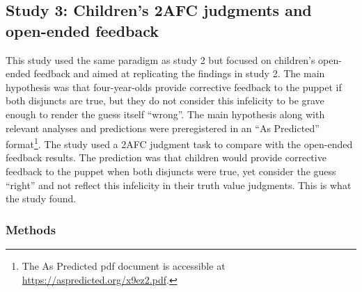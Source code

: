 \documentclass[floatsintext,man]{apa6}
\theoremstyle{definition}
\theoremstyle{definition}
\theoremstyle{definition}
\theoremstyle{remark}
\begin{document}
\subsection{Study 3: Children's 2AFC judgments and open-ended
feedback}\label{study-3-childrens-2afc-judgments-and-open-ended-feedback}

This study used the same paradigm as study 2 but focused on children's
open-ended feedback and aimed at replicating the findings in study 2.
The main hypothesis was that four-year-olds provide corrective feedback
to the puppet if both disjuncts are true, but they do not consider this
infelicity to be grave enough to render the guess itself
\enquote{wrong}. The main hypothesis along with relevant analyses and
predictions were preregistered in an \enquote{As Predicted}
format\footnote{The As Predicted pdf document is accessible at
  \url{https://aspredicted.org/x9ez2.pdf}.}. The study used a 2AFC
judgment task to compare with the open-ended feedback results. The
prediction was that children would provide corrective feedback to the
puppet when both disjuncts were true, yet consider the guess
\enquote{right} and not reflect this infelicity in their truth value
judgments. This is what the study found.

\subsubsection{Methods}\label{methods-2}
\end{document}
